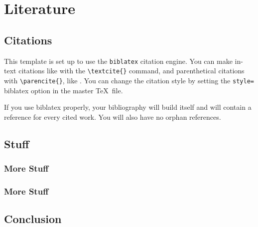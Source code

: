 \chapter{Literature}

\section{Citations}

This template is set up to use the \texttt{biblatex} citation engine. You can make
in-text citations like \textcite{RN81} with the \verb+\textcite{}+ command, and
parenthetical citations with \verb+\parencite{}+, like \parencite{RN35}.
You can change the citation style by setting the \texttt{style=} biblatex
option in the master \TeX \ file.

If you use biblatex properly, your bibliography will build itself and will
contain a reference for every cited work. You will also have no orphan references.



\section{Stuff}

\lipsum[2]

\subsection{More Stuff}

\lipsum


\subsection{More Stuff}
\lipsum

\section{Conclusion}
\lipsum[1]
